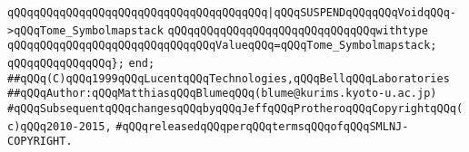 \verb|qQQqqQQqqQQqqQQqqQQqqQQqqQQqqQQqqQQqqQQq|\verb#|qQQqSUSPENDqQQqqQQqVoidqQQq->qQQqTome_Symbolmapstack#\newline
\newline
\verb|qQQqqQQqqQQqqQQqqQQqqQQqqQQqqQQqwithtype|\newline
\verb|qQQqqQQqqQQqqQQqqQQqqQQqqQQqqQQqValueqQQq=qQQqTome_Symbolmapstack;|\newline
\verb|qQQqqQQqqQQqqQQq};|\newline
\verb|end;|\newline
\newline
\newline
\newline
\verb|##qQQq(C)qQQq1999qQQqLucentqQQqTechnologies,qQQqBellqQQqLaboratories|\newline
\verb|##qQQqAuthor:qQQqMatthiasqQQqBlumeqQQq(blume@kurims.kyoto-u.ac.jp)|\newline
\verb|#qQQqSubsequentqQQqchangesqQQqbyqQQqJeffqQQqProtheroqQQqCopyrightqQQq(c)qQQq2010-2015,|\newline
\verb|#qQQqreleasedqQQqperqQQqtermsqQQqofqQQqSMLNJ-COPYRIGHT.|\newline

